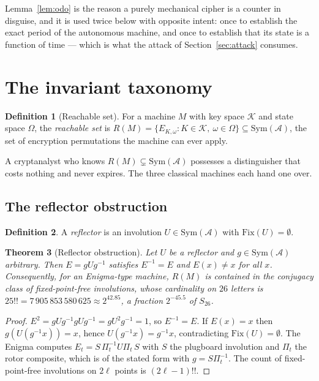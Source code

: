 \documentclass[11pt]{article}
\newtheorem{theorem}{Theorem}
\theoremstyle{definition}
\newtheorem{definition}[theorem]{Definition}
\newcommand{\Sym}{\mathrm{Sym}}
\newcommand{\Fix}{\mathrm{Fix}}
\newcommand{\Om}{\Omega}
\begin{document}
Lemma~\ref{lem:odo} is the reason a purely mechanical cipher is a counter in
disguise, and it is used twice below with opposite intent: once to establish the
exact period of the autonomous machine, and once to establish that its state is
a function of time --- which is what the attack of Section~\ref{sec:attack}
consumes.

\section{The invariant taxonomy}\label{sec:invariants}

\begin{definition}[Reachable set]
For a machine $M$ with key space $\mathcal{K}$ and state space $\Om$, the
\emph{reachable set} is $R(M) = \{E_{K,\omega} : K \in \mathcal{K},\ \omega \in
\Om\} \subseteq \Sym(\mathcal{A})$, the set of encryption permutations the
machine can ever apply.
\end{definition}

A cryptanalyst who knows $R(M) \subsetneq \Sym(\mathcal{A})$ possesses a
distinguisher that costs nothing and never expires. The three classical machines
each hand one over.

\subsection{The reflector obstruction}

\begin{definition}
A \emph{reflector} is an involution $U \in \Sym(\mathcal{A})$ with $\Fix(U) =
\emptyset$.
\end{definition}

\begin{theorem}[Reflector obstruction]\label{thm:reflector}
Let $U$ be a reflector and $g \in \Sym(\mathcal{A})$ arbitrary. Then $E = gUg^{-1}$
satisfies $E^{-1} = E$ and $E(x)\neq x$ for all $x$. Consequently, for an
Enigma-type machine, $R(M)$ is contained in the conjugacy class of
fixed-point-free involutions, whose cardinality on $26$ letters is $25!! =
7\,905\,853\,580\,625 \approx 2^{42.85}$, a fraction $2^{-45.5}$ of $S_{26}$.
\end{theorem}

\begin{proof}
$E^2 = gU g^{-1} g U g^{-1} = g U^2 g^{-1} = 1$, so $E^{-1} = E$. If $E(x) = x$
then $g(U(g^{-1}x)) = x$, hence $U(g^{-1}x) = g^{-1}x$, contradicting $\Fix(U) =
\emptyset$. The Enigma computes $E_t = S\,\Pi_t^{-1} U \Pi_t\, S$ with $S$ the
plugboard involution and $\Pi_t$ the rotor composite, which is of the stated
form with $g = S\Pi_t^{-1}$. The count of fixed-point-free involutions on $2\ell$
points is $(2\ell-1)!!$.
\end{proof}
\end{document}

